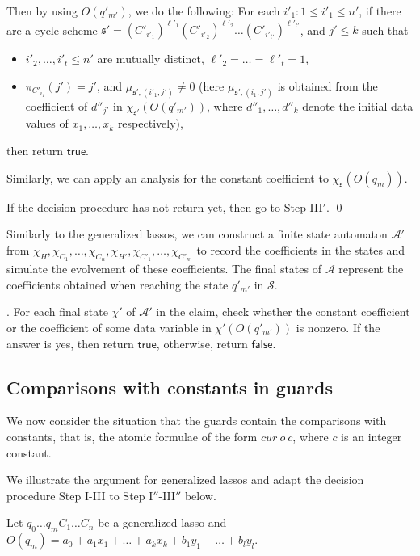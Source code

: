 \documentclass[runningheads,a4paper]{llncs}
\def\Aa{{\mathcal{A} }}
\def\Ss{{\mathcal{S} }}
\def\schm{{\mathfrak{s} }}
\newcommand\ltrue{\mathsf{true}}
\newcommand\lfalse{\mathsf{false}}
\begin{document}
Then by using $O(q'_{m'})$, we do the following: For each $i'_1: 1 \le i'_1 \le n'$, if there are a cycle scheme $\schm' =(C'_{i'_1})^{\ell'_1} (C'_{i'_2})^{\ell'_2} \dots (C'_{i'_{t'}})^{\ell'_{t'}}$, and $j' \le k$ such that
\begin{itemize}
\item $i'_2,\dots,i'_t \le n'$ are mutually distinct, $\ell'_2 = \dots = \ell'_t = 1$, 
%
\item $\pi_{C'_{i_1}}(j')=j'$, and $\mu_{\schm',(i'_1,j')} \neq 0$ (here $\mu_{\schm',(i_1,j')}$ is obtained from the coefficient of $d''_{j'}$ in  $\chi_{\schm'}(O(q'_{m'}))$, where $d''_1,\dots,d''_k$ denote the initial data values of $x_1,\dots,x_k$ respectively),
\end{itemize}
then return $\ltrue$. 

Similarly, we can apply an analysis for the constant coefficient to $\chi_\schm(O(q_m))$. 

If the decision procedure has not return yet, then go to Step III$'$. \qed

\smallskip

Similarly to the generalized lassos, we can construct a finite state automaton $\Aa'$ from $\chi_H,\chi_{C_1},\dots,\chi_{C_n},\chi_{H'}, \chi_{C'_1},\dots,\chi_{C'_{n'}}$ to record the coefficients in the states and simulate the evolvement of these coefficients. The final states of $\Aa$ represent the coefficients obtained when reaching the state $q'_{m'}$ in $\Ss$. 

\smallskip 

. For each final state $\chi'$ of $\Aa'$ in the claim, check whether the constant coefficient or the coefficient of some data variable in $\chi'(O(q'_{m'}))$ is nonzero. If the answer is yes, then return $\ltrue$, otherwise, return $\lfalse$.


\subsection{Comparisons with constants in guards}

We now consider the situation that the guards contain the comparisons with constants, that is, the atomic formulae of the form $cur\ o\ c$, where $c$ is an integer constant. 

We illustrate the argument for generalized lassos and adapt the decision procedure Step I-III to Step I$''$-III$''$ below.

Let $q_0 \dots q_m C_1 \dots C_n$ be a generalized lasso and $O(q_m)=a_0 + a_1 x_1 + \dots + a_k x_k + b_1 y_1 + \dots + b_l y_l$.
\end{document}
